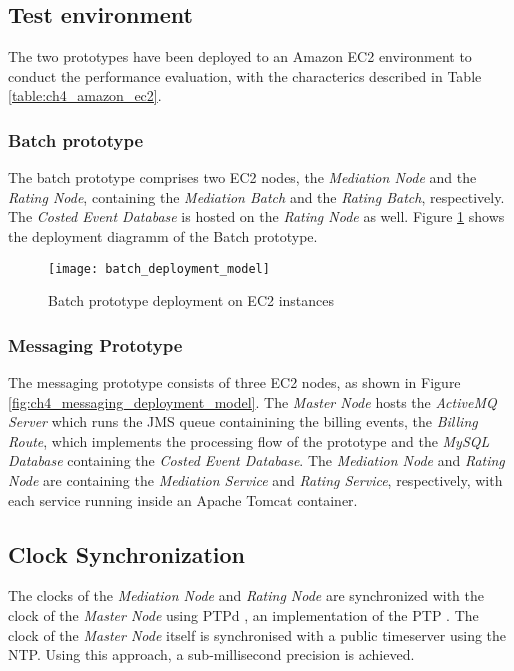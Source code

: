 \subsection{Test environment}
\label{sec:ch4_test_environment}

The two prototypes have been deployed to an Amazon EC2 environment to conduct the performance evaluation, with the characterics described in Table \ref{table:ch4_amazon_ec2}.

\subsubsection{Batch prototype}

The batch prototype comprises two EC2 nodes, the \emph{Mediation Node} and the \emph{Rating Node}, containing the \emph{Mediation Batch} and the \emph{Rating Batch}, respectively. The \emph{Costed Event Database} is hosted on the \emph{Rating Node} as well. Figure \ref{fig:ch4_batch_deployment_model} shows the deployment diagramm of the Batch prototype.

\begin{figure}[htbp]
	\centering
	\texttt{[image: batch\_deployment\_model]}
	\caption{Batch prototype deployment on EC2 instances}
	\label{fig:ch4_batch_deployment_model}
\end{figure}

\subsubsection{Messaging Prototype}

The messaging prototype consists of three EC2 nodes, as shown in Figure \ref{fig:ch4_messaging_deployment_model}. The \emph{Master Node} hosts the \emph{ActiveMQ Server} which runs the JMS queue containining the billing events, the \emph{Billing Route}, which implements the processing flow of the prototype and the \emph{MySQL Database} containing the \emph{Costed Event Database}. The \emph{Mediation Node} and \emph{Rating Node} are containing the \emph{Mediation Service} and \emph{Rating Service}, respectively, with each service running inside an Apache Tomcat container.

\subsection{Clock Synchronization}

The clocks of the \emph{Mediation Node} and \emph{Rating Node} are synchronized with the clock of the \emph{Master Node} using PTPd \citep{ptpd}, an implementation of the \ac{PTP} \citep{IEEE_PTP}. The clock of the \emph{Master Node} itself is synchronised with a public timeserver using the \ac{NTP}. Using this approach, a sub-millisecond precision is achieved.

